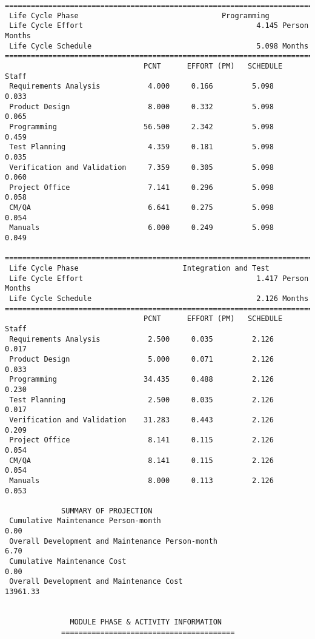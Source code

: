 \documentclass[11pt,a4paper,spanish,twoside]{report}
\begin{document}
{\begin{verbatim}
==============================================================================
 Life Cycle Phase                                 Programming
 Life Cycle Effort                                        4.145 Person Months
 Life Cycle Schedule                                      5.098 Months
==============================================================================
                                PCNT      EFFORT (PM)   SCHEDULE       Staff   
 Requirements Analysis           4.000     0.166         5.098        0.033
 Product Design                  8.000     0.332         5.098        0.065
 Programming                    56.500     2.342         5.098        0.459
 Test Planning                   4.359     0.181         5.098        0.035
 Verification and Validation     7.359     0.305         5.098        0.060
 Project Office                  7.141     0.296         5.098        0.058
 CM/QA                           6.641     0.275         5.098        0.054
 Manuals                         6.000     0.249         5.098        0.049

==============================================================================
 Life Cycle Phase                        Integration and Test
 Life Cycle Effort                                        1.417 Person Months
 Life Cycle Schedule                                      2.126 Months
==============================================================================
                                PCNT      EFFORT (PM)   SCHEDULE       Staff   
 Requirements Analysis           2.500     0.035         2.126        0.017
 Product Design                  5.000     0.071         2.126        0.033
 Programming                    34.435     0.488         2.126        0.230
 Test Planning                   2.500     0.035         2.126        0.017
 Verification and Validation    31.283     0.443         2.126        0.209
 Project Office                  8.141     0.115         2.126        0.054
 CM/QA                           8.141     0.115         2.126        0.054
 Manuals                         8.000     0.113         2.126        0.053

             SUMMARY OF PROJECTION
 Cumulative Maintenance Person-month                                 0.00
 Overall Development and Maintenance Person-month                    6.70
 Cumulative Maintenance Cost                                         0.00
 Overall Development and Maintenance Cost                        13961.33


		       MODULE PHASE & ACTIVITY INFORMATION
		     ========================================


\end{verbatim}}
\end{document}
